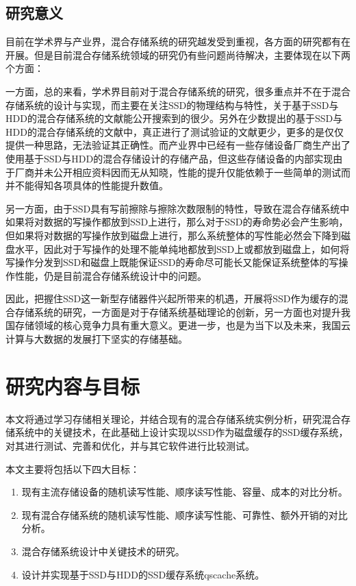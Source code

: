 \subsection{研究意义}

目前在学术界与产业界，混合存储系统的研究越发受到重视，各方面的研究都有在开展。但是目前混合存储系统领域的研究仍有些问题尚待解决，主要体现在以下两个方面：

一方面，总的来看，学术界目前对于混合存储系统的研究，很多重点并不在于混合存储系统的设计与实现，而主要在关注SSD的物理结构与特性，关于基于SSD与HDD的混合存储系统的文献\cite{guerra2011cost, kim2011hybridstore, 杨濮源2012一种时间敏感的, 陈震37基于磁盘和固态硬盘的混合存储系统研究综述}能公开搜索到的很少。另外在少数提出的基于SSD与HDD的混合存储系统的文献中，真正进行了测试验证的文献更少，更多的是仅仅提供一种思路，无法验证其正确性。而产业界中已经有一些存储设备厂商生产出了使用基于SSD与HDD的混合存储设计的存储产品，但这些存储设备的内部实现由于厂商并未公开相应资料因而无从知晓，性能的提升仅能依赖于一些简单的测试而并不能得知各项具体的性能提升数值。

另一方面，由于SSD具有写前擦除与擦除次数限制的特性，导致在混合存储系统中如果将对数据的写操作都放到SSD上进行，那么对于SSD的寿命势必会产生影响，但如果将对数据的写操作放到磁盘上进行，那么系统整体的写性能必然会下降到磁盘水平，因此对于写操作的处理不能单纯地都放到SSD上或都放到磁盘上，如何将写操作分发到SSD和磁盘上既能保证SSD的寿命尽可能长又能保证系统整体的写操作性能，仍是目前混合存储系统设计中的问题。

因此，把握住SSD这一新型存储器件兴起所带来的机遇，开展将SSD作为缓存的混合存储系统的研究，一方面是对于存储系统基础理论的创新，另一方面也对提升我国存储领域的核心竞争力具有重大意义。更进一步，也是为当下以及未来，我国云计算与大数据的发展打下坚实的存储基础。

\section{研究内容与目标}

本文将通过学习存储相关理论，并结合现有的混合存储系统实例分析，研究混合存储系统中的关键技术，在此基础上设计实现以SSD作为磁盘缓存的SSD缓存系统，对其进行测试、完善和优化，并与其它软件进行比较测试。

本文主要将包括以下四大目标：
\begin{enumerate}
    \item 现有主流存储设备的随机读写性能、顺序读写性能、容量、成本的对比分析。
    \item 现有混合存储系统的随机读写性能、顺序读写性能、可靠性、额外开销的对比分析。
    \item 混合存储系统设计中关键技术的研究。
    \item 设计并实现基于SSD与HDD的SSD缓存系统qscache系统。
\end{enumerate}

